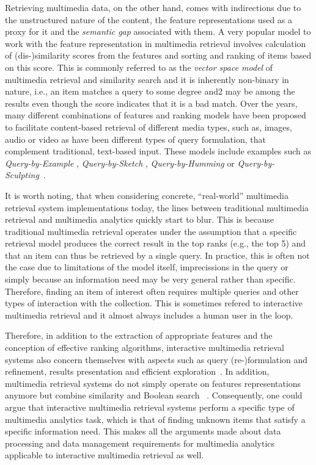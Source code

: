 Retrieving multimedia data, on the other hand, comes with indirections due to the unstructured nature of the content, the feature representations used as a proxy for it and the \emph{semantic gap} \cite{Blanken:2007multimedia, Rossetto:2018thesis} associated with them. A very popular model to work with the feature representation in multimedia retrieval involves calculation of (dis-)similarity scores from the features and sorting and ranking of items based on this score. This is commonly referred to as the \emph{vector space model} of multimedia retrieval and similarity search \cite{Zezula:2006Similarity} and it is inherently non-binary in nature, i.e., an item matches a query to some degree and2 may be among the results even though the score indicates that it is a bad match. Over the years, many different combinations of features and ranking models have been proposed to facilitate content-based retrieval of different media types, such as, images, audio or video \cite{Hu:2011Survey,Dharani:2013Survey,Murthy:2018Content} as have been different types of query formulation, that complement traditional, text-based input. These models include examples such as \emph{Query-by-Example} \cite{Kelly:1995Query}, \emph{Query-by-Sketch} \cite{Sciascio:1999Content}, \emph{Query-by-Humming} \cite{Ghias:1995query} or \emph{Query-by-Sculpting}~\cite{Boerlin:20203d}.

It is worth noting, that when considering concrete, ``real-world'' multimedia retrieval system implementations today, the lines between traditional multimedia retrieval and multimedia analytics quickly start to blur. This is because traditional multimedia retrieval operates under the assumption that a specific retrieval model produces the correct result in the top ranks (e.g., the top 5) and that an item can thus be retrieved by a single query. In practice, this is often not the case due to limitations of the model itself, imprecissions in the query or simply because an information need may be very general rather than specific. Therefore, finding an item of interest often requires multiple queries and other types of interaction with the collection. This is sometimes refered to interactive multimedia retrieval and it almost always includes a human user in the loop.

Therefore, in addition to the extraction of appropriate features and the conception of effective ranking algorithms, interactive multimedia retrieval systems also concern themselves with aspects such as query (re-)formulation and refinement, results presentation and efficient exploration~\cite{Lokovc:2019Interactive}. In addition, multimedia retrieval systems do not simply operate on features representations anymore but combine similarity and Boolean search ~\cite{Rossetto:2020Interactive}. Consequently, one could argue that interactive multimedia retrieval systems perform a specific type of multimedia analytics task, which is that of finding unknown items that satisfy a specific information need. This makes all the arguments made about data processing and data management requirements for multimedia analytics applicable to interactive multimedia retrieval as well.

